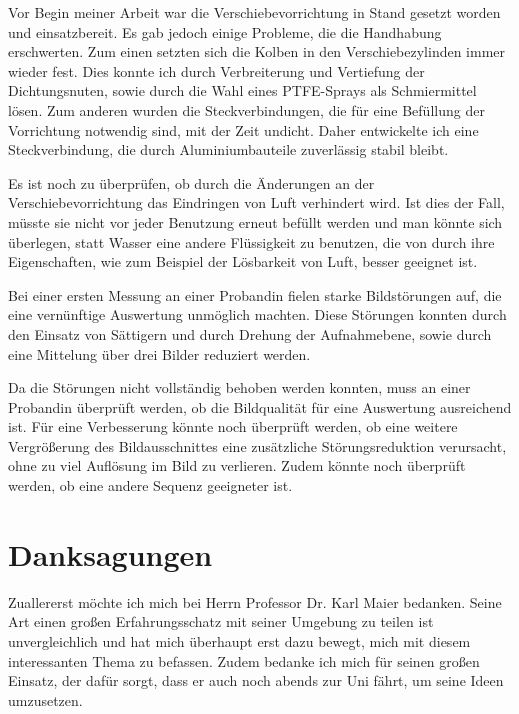 \documentclass[
    11pt,
    ngerman
]{scrbook}
\begin{document}
    Vor Begin meiner Arbeit war die Verschiebevorrichtung in Stand gesetzt
    worden und einsatzbereit. Es gab jedoch einige Probleme, die die
    Handhabung erschwerten. Zum einen setzten sich die Kolben in den
    Verschiebezylinden immer wieder fest. Dies konnte ich durch Verbreiterung
    und Vertiefung der Dichtungsnuten, sowie durch die Wahl eines PTFE-Sprays
    als Schmiermittel lösen. Zum anderen wurden die Steckverbindungen, die für
    eine Befüllung der Vorrichtung notwendig sind, mit der Zeit undicht. Daher
    entwickelte ich eine Steckverbindung, die durch Aluminiumbauteile
    zuverlässig stabil bleibt.
    
    Es ist noch zu überprüfen, ob durch die Änderungen an der
    Verschiebevorrichtung das Eindringen von Luft verhindert wird. Ist dies
    der Fall, müsste sie nicht vor jeder Benutzung erneut befüllt werden und
    man könnte sich überlegen, statt Wasser eine andere Flüssigkeit zu
    benutzen, die von durch ihre Eigenschaften, wie zum Beispiel der
    Lösbarkeit von Luft, besser geeignet ist.

    Bei einer ersten Messung an einer Probandin fielen starke Bildstörungen
    auf, die eine vernünftige Auswertung unmöglich machten. Diese Störungen
    konnten durch den Einsatz von Sättigern und durch Drehung der
    Aufnahmebene, sowie durch eine Mittelung über drei Bilder reduziert werden.
    
    Da die Störungen nicht vollständig behoben werden konnten, muss an einer
    Probandin überprüft werden, ob die Bildqualität für eine Auswertung
    ausreichend ist. Für eine Verbesserung könnte noch überprüft werden, ob
    eine weitere Vergrößerung des Bildausschnittes eine zusätzliche
    Störungsreduktion verursacht, ohne zu viel Auflösung im Bild zu verlieren.
    Zudem könnte noch überprüft werden, ob eine andere Sequenz geeigneter ist.



    
    \begin{sloppy}
        \IfFileExists{\bibliographyfile}{
            \printbibliography
        }{}
    \end{sloppy}

    \chapter*{Danksagungen}

    Zuallererst möchte ich mich bei Herrn Professor Dr. Karl Maier bedanken. Seine Art einen großen Erfahrungsschatz mit seiner Umgebung zu teilen ist unvergleichlich und hat mich überhaupt erst dazu bewegt, mich mit diesem interessanten Thema zu befassen. Zudem bedanke ich mich für seinen großen Einsatz, der dafür sorgt, dass er auch noch abends zur Uni fährt, um seine Ideen umzusetzen.
\end{document}
